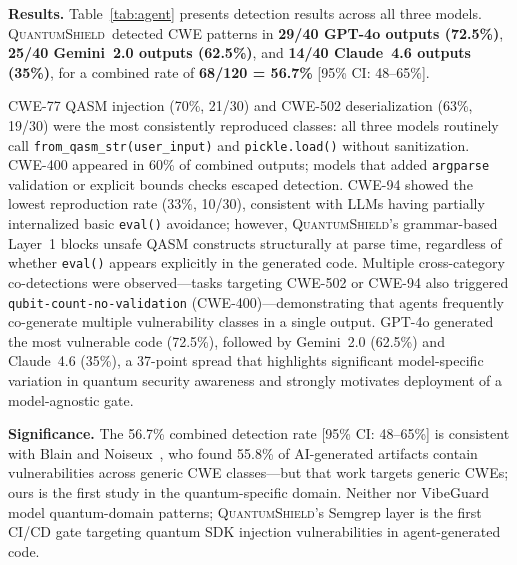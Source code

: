 \documentclass[conference,compsoc]{IEEEtran}
\newcommand{\tool}{\textsc{QuantumShield}}
\begin{document}
\noindent \textbf{Results.}
Table~\ref{tab:agent} presents detection results across all three models.
\tool\ detected CWE patterns in \textbf{29/40 GPT-4o outputs (72.5\%)},
\textbf{25/40 Gemini~2.0 outputs (62.5\%)}, and
\textbf{14/40 Claude~4.6 outputs (35\%)},
for a combined rate of \textbf{68/120 = 56.7\%} [95\% CI: 48--65\%].

\noindent CWE-77 QASM injection (70\%, 21/30) and CWE-502 deserialization
(63\%, 19/30) were the most consistently reproduced classes: all three
models routinely call \texttt{from\_qasm\_str(user\_input)} and
\texttt{pickle.load()} without sanitization.
CWE-400 appeared in 60\% of combined outputs; models that added
\texttt{argparse} validation or explicit bounds checks escaped detection.
CWE-94 showed the lowest reproduction rate (33\%, 10/30), consistent
with LLMs having partially internalized basic \texttt{eval()} avoidance;
however, \tool's grammar-based Layer~1 blocks unsafe QASM constructs
structurally at parse time, regardless of whether \texttt{eval()}
appears explicitly in the generated code.
Multiple cross-category co-detections were observed---tasks targeting
CWE-502 or CWE-94 also triggered \texttt{qubit-count-no-validation}
(CWE-400)---demonstrating that agents frequently co-generate multiple
vulnerability classes in a single output.
GPT-4o generated the most vulnerable code (72.5\%), followed by
Gemini~2.0 (62.5\%) and Claude~4.6 (35\%), a 37-point spread that
highlights significant model-specific variation in quantum security
awareness and strongly motivates deployment of a model-agnostic gate.

\noindent \textbf{Significance.}
The 56.7\% combined detection rate [95\% CI: 48--65\%] is consistent
with Blain and Noiseux~\cite{bbd2026}, who found 55.8\% of AI-generated
artifacts contain vulnerabilities across generic CWE classes---but that
work targets generic CWEs; ours is the first study in the quantum-specific
domain.
Neither \cite{bbd2026} nor VibeGuard~\cite{vibeguard2026} model
quantum-domain patterns; \tool's Semgrep layer is the first CI/CD gate
targeting quantum SDK injection vulnerabilities in agent-generated code.
\end{document}
